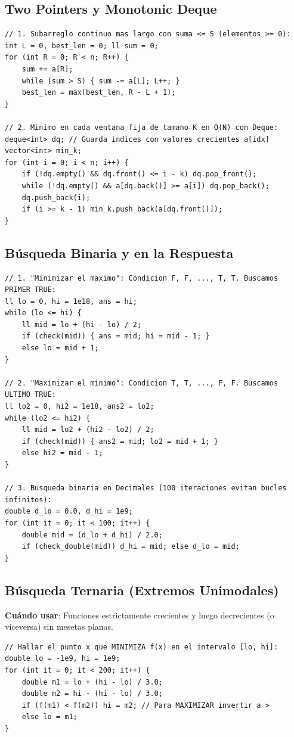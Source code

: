 \documentclass[9pt,twocolumn,a4paper]{extarticle}
\begin{document}
\subsection{Two Pointers y Monotonic Deque}
\begin{lstlisting}
// 1. Subarreglo continuo mas largo con suma <= S (elementos >= 0):
int L = 0, best_len = 0; ll sum = 0;
for (int R = 0; R < n; R++) {
    sum += a[R];
    while (sum > S) { sum -= a[L]; L++; }
    best_len = max(best_len, R - L + 1);
}

// 2. Minimo en cada ventana fija de tamano K en O(N) con Deque:
deque<int> dq; // Guarda indices con valores crecientes a[idx]
vector<int> min_k;
for (int i = 0; i < n; i++) {
    if (!dq.empty() && dq.front() <= i - k) dq.pop_front();
    while (!dq.empty() && a[dq.back()] >= a[i]) dq.pop_back();
    dq.push_back(i);
    if (i >= k - 1) min_k.push_back(a[dq.front()]);
}
\end{lstlisting}

\subsection{Búsqueda Binaria y en la Respuesta}
\begin{lstlisting}
// 1. "Minimizar el maximo": Condicion F, F, ..., T, T. Buscamos PRIMER TRUE:
ll lo = 0, hi = 1e18, ans = hi;
while (lo <= hi) {
    ll mid = lo + (hi - lo) / 2;
    if (check(mid)) { ans = mid; hi = mid - 1; }
    else lo = mid + 1;
}

// 2. "Maximizar el minimo": Condicion T, T, ..., F, F. Buscamos ULTIMO TRUE:
ll lo2 = 0, hi2 = 1e18, ans2 = lo2;
while (lo2 <= hi2) {
    ll mid = lo2 + (hi2 - lo2) / 2;
    if (check(mid)) { ans2 = mid; lo2 = mid + 1; }
    else hi2 = mid - 1;
}

// 3. Busqueda binaria en Decimales (100 iteraciones evitan bucles infinitos):
double d_lo = 0.0, d_hi = 1e9;
for (int it = 0; it < 100; it++) {
    double mid = (d_lo + d_hi) / 2.0;
    if (check_double(mid)) d_hi = mid; else d_lo = mid;
}
\end{lstlisting}

\subsection{Búsqueda Ternaria (Extremos Unimodales)}
\textbf{Cuándo usar}: Funciones estrictamente crecientes y luego decrecientes (o viceversa) sin mesetas planas.
\begin{lstlisting}
// Hallar el punto x que MINIMIZA f(x) en el intervalo [lo, hi]:
double lo = -1e9, hi = 1e9;
for (int it = 0; it < 200; it++) {
    double m1 = lo + (hi - lo) / 3.0;
    double m2 = hi - (hi - lo) / 3.0;
    if (f(m1) < f(m2)) hi = m2; // Para MAXIMIZAR invertir a >
    else lo = m1;
}
\end{lstlisting}
\end{document}
